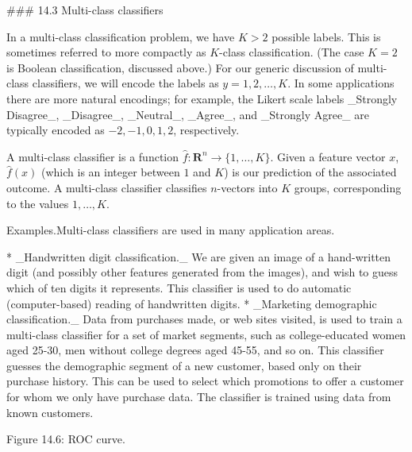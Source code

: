 

### 14.3 Multi-class classifiers

In a multi-class classification problem, we have \(K>2\) possible labels. This is sometimes referred to more compactly as \(K\)-class classification. (The case \(K=2\) is Boolean classification, discussed above.) For our generic discussion of multi-class classifiers, we will encode the labels as \(y=1,2,\ldots,K\). In some applications there are more natural encodings; for example, the Likert scale labels _Strongly Disagree_, _Disagree_, _Neutral_, _Agree_, and _Strongly Agree_ are typically encoded as \(-2,-1,0,1,2\), respectively.

A multi-class classifier is a function \(\hat{f}:\mathbf{R}^{n}\rightarrow\{1,\ldots,K\}\). Given a feature vector \(x\), \(\hat{f}(x)\) (which is an integer between \(1\) and \(K\)) is our prediction of the associated outcome. A multi-class classifier classifies \(n\)-vectors into \(K\) groups, corresponding to the values \(1,\ldots,K\).

Examples.Multi-class classifiers are used in many application areas.

* _Handwritten digit classification._ We are given an image of a hand-written digit (and possibly other features generated from the images), and wish to guess which of ten digits it represents. This classifier is used to do automatic (computer-based) reading of handwritten digits.
* _Marketing demographic classification._ Data from purchases made, or web sites visited, is used to train a multi-class classifier for a set of market segments, such as college-educated women aged 25-30, men without college degrees aged 45-55, and so on. This classifier guesses the demographic segment of a new customer, based only on their purchase history. This can be used to select which promotions to offer a customer for whom we only have purchase data. The classifier is trained using data from known customers.

Figure 14.6: ROC curve.

